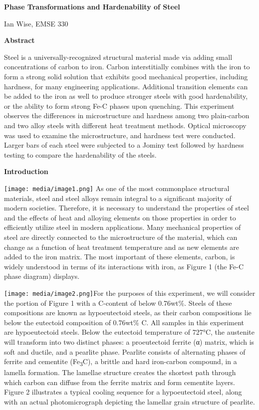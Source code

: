 \documentclass[]{article}
\date{}
\begin{document}
\textbf{Phase Transformations and Hardenability of Steel}

Ian Wise, EMSE 330

\textbf{Abstract}

Steel is a universally-recognized structural material made via adding
small concentrations of carbon to iron. Carbon interstitially combines
with the iron to form a strong solid solution that exhibits good
mechanical properties, including hardness, for many engineering
applications. Additional transition elements can be added to the iron as
well to produce stronger steels with good hardenability, or the ability
to form strong Fe-C phases upon quenching. This experiment observes the
differences in microstructure and hardness among two plain-carbon and
two alloy steels with different heat treatment methods. Optical
microscopy was used to examine the microstructure, and hardness test
were conducted. Larger bars of each steel were subjected to a Jominy
test followed by hardness testing to compare the hardenability of the
steels.

\textbf{Introduction}

\texttt{[image: media/image1.png]} As one of
the most commonplace structural materials, steel and steel alloys remain
integral to a significant majority of modern societies. Therefore, it is
necessary to understand the properties of steel and the effects of heat
and alloying elements on those properties in order to efficiently
utilize steel in modern applications. Many mechanical properties of
steel are directly connected to the microstructure of the material,
which can change as a function of heat treatment temperature and as new
elements are added to the iron matrix. The most important of these
elements, carbon, is widely understood in terms of its interactions with
iron, as Figure 1 (the Fe-C phase diagram) displays.

\texttt{[image: media/image2.png]}For
the purposes of this experiment, we will consider the portion of Figure
1 with a C-content of below 0.76wt\%. Steels of these compositions are
known as hypoeutectoid steels, as their carbon compositions lie below
the eutectoid composition of 0.76wt\% C. All samples in this experiment
are hypoeutectoid steels. Below the eutectoid temperature of 727°C, the
austenite will transform into two distinct phases: a proeutectoid
ferrite (α) matrix, which is soft and ductile, and a pearlite phase.
Pearlite consists of alternating phases of ferrite and cementite
(Fe\textsubscript{3}C), a brittle and hard iron-carbon compound, in a
lamella formation. The lamellae structure creates the shortest path
through which carbon can diffuse from the ferrite matrix and form
cementite layers. Figure 2 illustrates a typical cooling sequence for a
hypoeutectoid steel, along with an actual photomicrograph depicting the
lamellar grain structure of pearlite.
\end{document}
